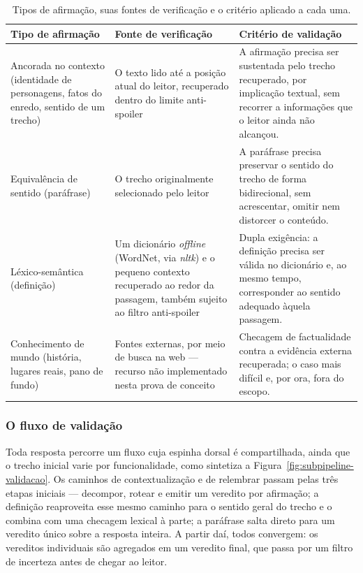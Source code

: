 \begin{table}[ht]
  \centering
  \caption{Tipos de afirmação, suas fontes de verificação e o critério aplicado a cada uma.}
  \label{tab:fontes-verificacao}
  \begin{tabularx}{\textwidth}{>{\raggedright\arraybackslash}p{} >{\raggedright\arraybackslash}X >{\raggedright\arraybackslash}X}
  \toprule
  \textbf{Tipo de afirmação} & \textbf{Fonte de verificação} & \textbf{Critério de validação} \\
  \midrule
  Ancorada no contexto (identidade de personagens, fatos do enredo, sentido de um trecho) & O texto lido até a posição atual do leitor, recuperado dentro do limite anti-spoiler & A afirmação precisa ser sustentada pelo trecho recuperado, por implicação textual, sem recorrer a informações que o leitor ainda não alcançou. \\
  \addlinespace
  Equivalência de sentido (paráfrase) & O trecho originalmente selecionado pelo leitor & A paráfrase precisa preservar o sentido do trecho de forma bidirecional, sem acrescentar, omitir nem distorcer o conteúdo. \\
  \addlinespace
  Léxico-semântica (definição) & Um dicionário \textit{offline} (WordNet, via \textit{nltk}) e o pequeno contexto recuperado ao redor da passagem, também sujeito ao filtro anti-spoiler & Dupla exigência: a definição precisa ser válida no dicionário e, ao mesmo tempo, corresponder ao sentido adequado àquela passagem. \\
  \addlinespace
  Conhecimento de mundo (história, lugares reais, pano de fundo) & Fontes externas, por meio de busca na web --- recurso não implementado nesta prova de conceito & Checagem de factualidade contra a evidência externa recuperada; o caso mais difícil e, por ora, fora do escopo. \\
  \bottomrule
  \end{tabularx}
  \end{table}




\subsubsection*{O fluxo de validação}
\label{subsubsec:pipeline}

Toda resposta percorre um fluxo cuja espinha dorsal é compartilhada, ainda que o trecho inicial varie por funcionalidade, como sintetiza a Figura~\ref{fig:subpipeline-validacao}. Os caminhos de contextualização e de relembrar passam pelas três etapas iniciais --- decompor, rotear e emitir um veredito por afirmação; a definição reaproveita esse mesmo caminho para o sentido geral do trecho e o combina com uma checagem lexical à parte; a paráfrase salta direto para um veredito único sobre a resposta inteira. A partir daí, todos convergem: os vereditos individuais são agregados em um veredito final, que passa por um filtro de incerteza antes de chegar ao leitor.

